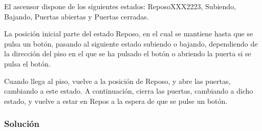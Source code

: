 El ascensor dispone de los siguientes estados: ReposoXXX2223, Subiendo, Bajando, Puertas abiertas y Puertas cerradas.

La posición inicial parte del estado Reposo, en el cual se mantiene hasta que se pulsa un botón, pasando al siguiente estado subiendo o bajando, dependiendo de la dirección del piso en el que se ha pulsado el botón o abriendo la puerta si se pulsa el botón.

Cuando llega al piso, vuelve a la posición de Reposo, y abre las puertas, cambiando a este estado. A continuación, cierra las puertas, cambiando a dicho estado, y vuelve a estar en Repos a la espera de que se pulse un botón.

\subsubsection{Solución}

%
%

